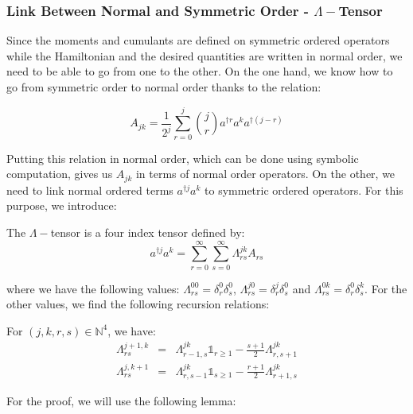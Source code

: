 \subsubsection{Link Between Normal and Symmetric Order - $\Lambda-$Tensor}

Since the moments and cumulants are defined on symmetric ordered operators while the Hamiltonian and the desired quantities are written in normal order, we need to be able to go from one to the other. On the one hand, we know how to go from symmetric order to normal order thanks to the relation:

\begin{equation}
    A_{j k} = \frac{1}{2^j} \sum_{r=0}^j \binom{j}{r} a^{\dagger r} a^{k} a^{\dagger (j-r)}
\end{equation}

Putting this relation in normal order, which can be done using symbolic computation, gives us $A_{j k}$ in terms of normal order operators. On the other, we need to link normal ordered terms $a^{\dagger j} a^k$ to symmetric ordered operators. For this purpose, we introduce:

\begin{definition}
    The $\Lambda-$tensor is a four index tensor defined by:
        \begin{equation} \label{define_lambda}
            a^{\dagger j} a^k = \sum_{r=0}^\infty \sum_{s=0}^\infty \Lambda^{j k}_{r s} A_{r s}
        \end{equation}
\end{definition}

where we have the following values: $\Lambda^{0 0}_{r s} = \delta^0_r \delta^0_s$, $\Lambda^{j 0}_{r s} = \delta^j_r \delta^0_s$ and $\Lambda^{0 k}_{r s} = \delta^0_r \delta^k_s$. For the other values, we find the following recursion relations:

\begin{theorem}
    For $(j, k, r, s) \in \mathbb{N}^4$, we have:
    \begin{eqnarray}
        \Lambda^{j+1, k}_{r s} &=& \Lambda^{j k}_{r-1, s} \mathbb{1}_{r \ge 1} - \frac{s+1}{2} \Lambda^{j k}_{r, s+1} \\
        \Lambda^{j, k+1}_{r s} &=& \Lambda^{j k}_{r, s-1} \mathbb{1}_{s \ge 1} - \frac{r+1}{2} \Lambda^{j k}_{r+1, s}
    \end{eqnarray}
\end{theorem}

For the proof, we will use the following lemma:

